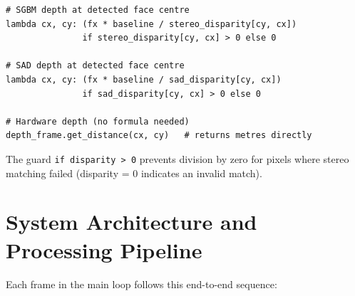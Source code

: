 \documentclass[12pt, a4paper]{article}
\newcommand{\code}[1]{\texttt{\small#1}}
\begin{document}
\begin{lstlisting}[caption={Depth readout per face (live\_stream.py lines 185--199)}]
# SGBM depth at detected face centre
lambda cx, cy: (fx * baseline / stereo_disparity[cy, cx])
               if stereo_disparity[cy, cx] > 0 else 0

# SAD depth at detected face centre
lambda cx, cy: (fx * baseline / sad_disparity[cy, cx])
               if sad_disparity[cy, cx] > 0 else 0

# Hardware depth (no formula needed)
depth_frame.get_distance(cx, cy)   # returns metres directly
\end{lstlisting}

The guard \code{if disparity > 0} prevents division by zero for pixels where
stereo matching failed (disparity = 0 indicates an invalid match).

\section{System Architecture and Processing Pipeline}

Each frame in the main loop follows this end-to-end sequence:
\end{document}
